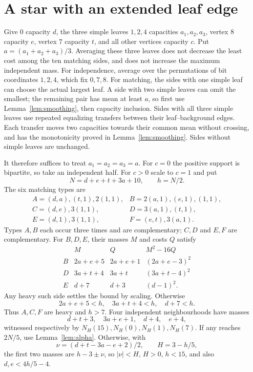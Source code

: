 \documentclass[11pt]{article}
\begin{document}
\section{A star with an extended leaf edge}
Give $0$ capacity $d$, the three simple leaves $1,2,4$ capacities
$a_1,a_2,a_3$, vertex $8$ capacity $e$, vertex $7$ capacity $t$,
and all other vertices capacity $c$. Put $a=(a_1+a_2+a_3)/3$.
Averaging these three leaves does not decrease the least cost among
the ten matching sides, and does not increase the maximum independent mass.
For independence, average over the permutations of bit coordinates
$1,2,4$, which fix $0,7,8$.
For matching, the sides with one simple leaf can choose the actual
largest leaf. A side with two simple leaves can omit the smallest;
the remaining pair has mean at least $a$, so first use
Lemma~\ref{lem:smoothing}, then capacity inclusion.
Sides with all three simple leaves use repeated equalizing transfers
between their leaf--background edges. Each transfer moves two capacities
towards their common mean without crossing, and has the monotonicity
proved in Lemma~\ref{lem:smoothing}.
Sides without simple leaves are unchanged.

It therefore suffices to treat $a_1=a_2=a_3=a$.
For $c=0$ the positive support is bipartite, so take an independent half.
For $c>0$ scale to $c=1$ and put
\[
 N=d+e+t+3a+10,\qquad h=N/2 .
\]
The six matching types are
\[
\begin{array}{ll}
 A=(d,a),(t,1),2(1,1),&B=2(a,1),(e,1),(1,1),\\
 C=(d,e),3(1,1),&D=3(a,1),(t,1),\\
 E=(d,1),3(1,1),&F=(e,t),3(a,1).
\end{array}
\]
Types $A,B$ each occur three times and are complementary;
$C,D$ and $E,F$ are complementary.
For $B,D,E$, their masses $M$ and costs $Q$ satisfy
\[
\begin{array}{c|c|c|c}
 &M&Q&M^2-16Q\\
 B&2a+e+5&2a+e+1&(2a+e-3)^2\\
 D&3a+t+4&3a+t&(3a+t-4)^2\\
 E&d+7&d+3&(d-1)^2 .
\end{array}
\]
Any heavy such side settles the bound by scaling.
Otherwise
\[
 2a+e+5<h,\quad 3a+t+4<h,\quad d+7<h. \tag{BM}
\]
Thus $A,C,F$ are heavy and $h>7$.
Four independent neighbourhoods have masses
\[
 d+t+3,\quad3a+e+1,\quad d+4,\quad e+4,
\]
witnessed respectively by $N_H(15),N_H(0),N_H(1),N_H(7)$.
If any reaches $2N/5$, use Lemma~\ref{lem:alpha}.
Otherwise, with
\[
 \nu=(d+t-3a-e+2)/2,\qquad H=3-h/5,
\]
the first two masses are $h-3\pm\nu$, so
$|\nu|<H$, $H>0$, $h<15$, and also $d,e<4h/5-4$.
\end{document}
